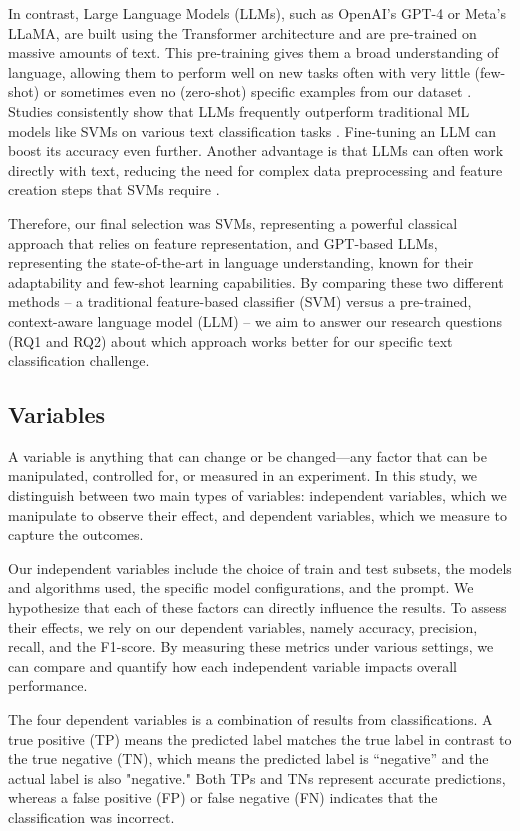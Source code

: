 In contrast, Large Language Models (LLMs), such as OpenAI's GPT-4 or Meta's LLaMA, are built using the Transformer architecture and are pre-trained on massive amounts of text. This pre-training gives them a broad understanding of language, allowing them to perform well on new tasks often with very little (few-shot) or sometimes even no (zero-shot) specific examples from our dataset \cite{brown2020language, touvron2023llama}. Studies consistently show that LLMs frequently outperform traditional ML models like SVMs on various text classification tasks \cite{moller2024parrot, betianu2024dallmi}. Fine-tuning an LLM can boost its accuracy even further. Another advantage is that LLMs can often work directly with text, reducing the need for complex data preprocessing and feature creation steps that SVMs require \cite{oh2024language}.

Therefore, our final selection was SVMs, representing a powerful classical approach that relies on feature representation, and GPT-based LLMs, representing the state-of-the-art in language understanding, known for their adaptability and few-shot learning capabilities. By comparing these two different methods – a traditional feature-based classifier (SVM) versus a pre-trained, context-aware language model (LLM) – we aim to answer our research questions (RQ1 and RQ2) about which approach works better for our specific text classification challenge.


\subsection{Variables}
A variable is anything that can change or be changed—any factor that can be manipulated, controlled for, or measured in an experiment. In this study, we distinguish between two main types of variables: independent variables, which we manipulate to observe their effect, and dependent variables, which we measure to capture the outcomes.

Our independent variables include the choice of train and test subsets, the models and algorithms used, the specific model configurations, and the prompt. We hypothesize that each of these factors can directly influence the results. To assess their effects, we rely on our dependent variables, namely accuracy, precision, recall, and the F1-score. By measuring these metrics under various settings, we can compare and quantify how each independent variable impacts overall performance.

The four dependent variables is a combination of results from classifications.  A true positive (TP) means the predicted label matches the true label in contrast  to the true negative (TN), which means the predicted label is “negative” and the  actual label is also "negative." Both TPs and TNs represent accurate predictions,  whereas a false positive (FP) or false negative (FN) indicates that the  classification was incorrect.

